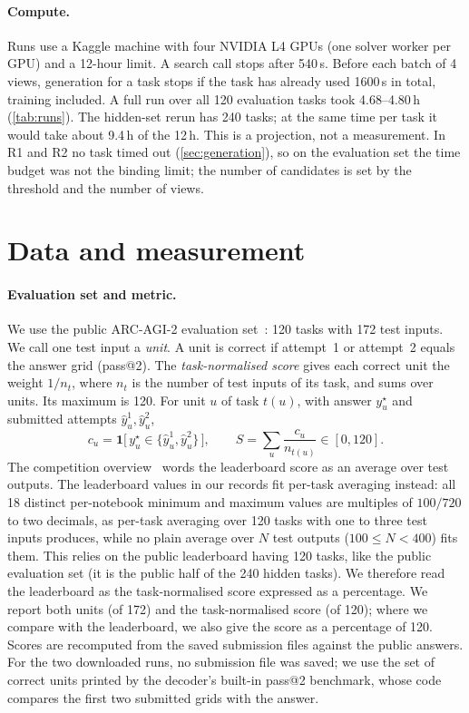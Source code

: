 \documentclass[11pt]{article}
\newcommand{\R}[1]{R#1}
\begin{document}
\paragraph{Compute.}
Runs use a Kaggle machine with four NVIDIA L4 GPUs (one solver worker per GPU) and a 12-hour limit.
A search call stops after 540\,s. Before each batch of 4 views, generation for a task stops if the task has already used 1600\,s in total, training included. A full run over all 120 evaluation tasks took 4.68--4.80\,h (\cref{tab:runs}).
The hidden-set rerun has 240 tasks; at the same time per task it would take about 9.4\,h of the 12\,h. This is a projection, not a measurement.
In \R{1} and \R{2} no task timed out (\cref{sec:generation}), so on the evaluation set the time budget was not the binding limit; the number of candidates is set by the threshold and the number of views.

\section{Data and measurement}
\label{sec:data}

\paragraph{Evaluation set and metric.}
We use the public ARC-AGI-2 evaluation set~\citep{chollet2025arcagi2,arcagi2repo}: 120 tasks with 172 test inputs. We call one test input a \emph{unit}.
A unit is correct if attempt~1 or attempt~2 equals the answer grid (pass@2). The \emph{task-normalised score} gives each correct unit the weight $1/n_t$, where $n_t$ is the number of test inputs of its task, and sums over units. Its maximum is 120.
For unit $u$ of task $t(u)$, with answer $y^\star_u$ and submitted attempts $\hat y^{1}_u, \hat y^{2}_u$,
\begin{equation}
\label{eq:score}
c_u = \mathbf{1}\big[\,y^\star_u \in \{\hat y^{1}_u, \hat y^{2}_u\}\,\big], \qquad
S = \sum_{u} \frac{c_u}{n_{t(u)}} \in [0, 120] .
\end{equation}
The competition overview~\citep{arcprize2026kaggle} words the leaderboard score as an average over test outputs. The leaderboard values in our records fit per-task averaging instead: all 18 distinct per-notebook minimum and maximum values are multiples of $100/720$ to two decimals, as per-task averaging over 120 tasks with one to three test inputs produces, while no plain average over $N$ test outputs ($100 \le N < 400$) fits them. This relies on the public leaderboard having 120 tasks, like the public evaluation set (it is the public half of the 240 hidden tasks). We therefore read the leaderboard as the task-normalised score expressed as a percentage.
We report both units (of 172) and the task-normalised score (of 120); where we compare with the leaderboard, we also give the score as a percentage of 120.
Scores are recomputed from the saved submission files against the public answers. For the two downloaded runs, no submission file was saved; we use the set of correct units printed by the decoder's built-in pass@2 benchmark, whose code compares the first two submitted grids with the answer.
\end{document}

